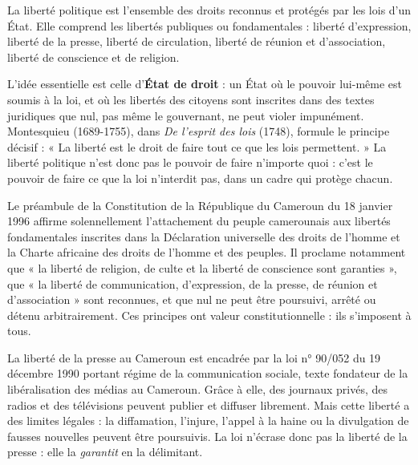 \documentclass[11pt]{article}
\newcommand{\cle}[1]{{\popxbold\color{popdark}#1}}
\begin{document}
\begin{definition}
La \cle{liberté politique} est l'ensemble des droits reconnus et protégés par les lois d'un État. Elle comprend les libertés publiques ou fondamentales : liberté d'expression, liberté de la presse, liberté de circulation, liberté de réunion et d'association, liberté de conscience et de religion.
\end{definition}

L'idée essentielle est celle d'\textbf{État de droit} : un État où le pouvoir lui-même est soumis à la loi, et où les libertés des citoyens sont inscrites dans des textes juridiques que nul, pas même le gouvernant, ne peut violer impunément. Montesquieu (1689-1755), dans \emph{De l'esprit des lois} (1748), formule le principe décisif : « La liberté est le droit de faire tout ce que les lois permettent. » La liberté politique n'est donc pas le pouvoir de faire n'importe quoi : c'est le pouvoir de faire ce que la loi n'interdit pas, dans un cadre qui protège chacun.

\begin{exemplebox}
Le préambule de la Constitution de la République du Cameroun du 18 janvier 1996 affirme solennellement l'attachement du peuple camerounais aux libertés fondamentales inscrites dans la Déclaration universelle des droits de l'homme et la Charte africaine des droits de l'homme et des peuples. Il proclame notamment que « la liberté de religion, de culte et la liberté de conscience sont garanties », que « la liberté de communication, d'expression, de la presse, de réunion et d'association » sont reconnues, et que nul ne peut être poursuivi, arrêté ou détenu arbitrairement. Ces principes ont valeur constitutionnelle : ils s'imposent à tous.
\end{exemplebox}

\begin{exemplebox}
La liberté de la presse au Cameroun est encadrée par la loi n° 90/052 du 19 décembre 1990 portant régime de la communication sociale, texte fondateur de la libéralisation des médias au Cameroun. Grâce à elle, des journaux privés, des radios et des télévisions peuvent publier et diffuser librement. Mais cette liberté a des limites légales : la diffamation, l'injure, l'appel à la haine ou la divulgation de fausses nouvelles peuvent être poursuivis. La loi n'écrase donc pas la liberté de la presse : elle la \emph{garantit} en la délimitant.
\end{exemplebox}
\end{document}
